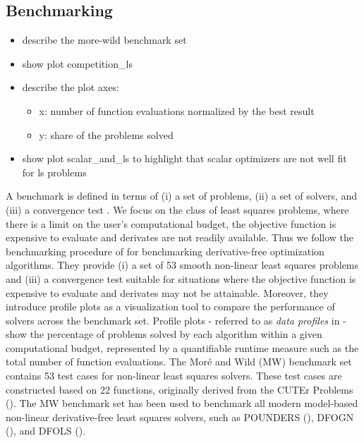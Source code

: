 \subsection{Benchmarking}
\label{subsec:benchmark-core-algo}
\begin{itemize}
    \item describe the more-wild benchmark set
    \item show plot competition\_ls
    \item describe the plot axes:
    \begin{itemize}
            \item x: number of function evaluations normalized by the best result
            \item y: share of the problems solved
        \end{itemize}
        \item show plot scalar\_and\_ls to highlight that scalar optimizers are not well fit for ls problems
    \end{itemize}



\noindent A benchmark is defined in terms of (i) a set of problems, (ii) a set of solvers, and
(iii) a convergence test \cite{Dolan2002}. We focus on the class of least squares problems, where there is a limit on the user's computational budget, the objective function is expensive to evaluate and derivates are not readily available.
Thus we follow the benchmarking procedure of \cite{MoreWild2009} for benchmarking derivative-free optimization algorithms. They provide (i) a set of 53 smooth non-linear least squares problems and (iii) a convergence test suitable for situations where the objective function is expensive to evaluate and derivates may not be attainable.
Moreover, they introduce profile plots as a visualization tool to compare the performance of solvers across the benchmark set.
Profile plots - referred to as \textit{data profiles} in \cite{MoreWild2009} - show the percentage of problems solved by each algorithm within a given computational budget, represented by a quantifiable runtime measure such as the total number of function evaluations.
The Moré and Wild (MW) benchmark set contains 53 test cases for non-linear least squares solvers.
These test cases are constructed based on 22 functions, originally derived from the CUTEr
Problems (\cite{Gould2003}). The MW benchmark set has been used to benchmark all modern model-based non-linear derivative-free least squares solvers, such as POUNDERS (\cite{Wild2015}), DFOGN (\cite{Cartis2017}), and DFOLS (\cite{Cartis2019}).



